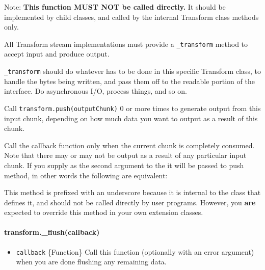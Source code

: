 Note: \textbf{This function MUST NOT be called directly.} It should be
implemented by child classes, and called by the internal Transform class
methods only.

All Transform stream implementations must provide a \texttt{\_transform}
method to accept input and produce output.

\texttt{\_transform} should do whatever has to be done in this specific
Transform class, to handle the bytes being written, and pass them off to
the readable portion of the interface. Do asynchronous I/O, process
things, and so on.

Call \texttt{transform.push(outputChunk)} 0 or more times to generate
output from this input chunk, depending on how much data you want to
output as a result of this chunk.

Call the callback function only when the current chunk is completely
consumed. Note that there may or may not be output as a result of any
particular input chunk. If you supply as the second argument to the it
will be passed to push method, in other words the following are
equivalent:

\begin{Shaded}
\begin{Highlighting}[]
 \NormalTok{= } 
  \NormalTok{();}
\NormalTok{\}}

 \NormalTok{= } 
  \NormalTok{(}
\NormalTok{\}}
\end{Highlighting}
\end{Shaded}

This method is prefixed with an underscore because it is internal to the
class that defines it, and should not be called directly by user
programs. However, you \textbf{are} expected to override this method in
your own extension classes.

\paragraph{transform.\_flush(callback)}\label{transform.ux5fflushcallback}

\begin{itemize}
\itemsep1pt\parskip0pt
\item
  \texttt{callback} \{Function\} Call this function (optionally with an
  error argument) when you are done flushing any remaining data.
\end{itemize}

